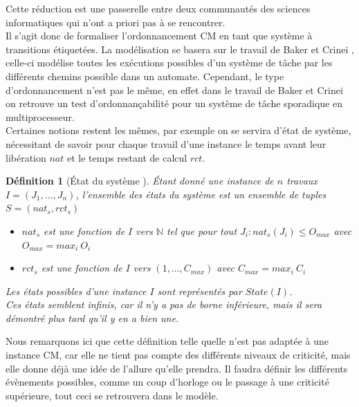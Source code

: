 \documentclass[a4paper]{report}
\theoremstyle{break}
\newtheorem{defin}{Définition}
\begin{document}
Cette réduction est une passerelle entre deux communautés des sciences informatiques qui n'ont a priori pas à se rencontrer.\\

Il s'agit donc de formaliser l'ordonnancement CM en tant que système à transitions étiquetées. La modélisation se basera sur le travail de Baker et Crinei \cite{bakerbrute}, celle-ci modélise toutes les exécutions possibles d'un système de tâche par les différents chemins possible dans un automate. Cependant, le type d'ordonnancement n'est pas le même, en effet dans le travail de Baker et Crinei on retrouve un test d'ordonnançabilité pour un système de tâche sporadique en multiprocesseur.\\

Certaines notions restent les mêmes, par exemple on se servira d'état de système, nécessitant de savoir pour chaque travail d'une instance le temps avant leur libération $nat$ et le temps restant de calcul $rct$.

\begin{defin}[État du système \cite{geeraerts2013multiprocessor}]
Étant donné une instance de $n$ travaux $I = (J_1, ..., J_n)$, l'ensemble des états du système est un ensemble de tuples $S = (nat_s, rct_s)$
\begin{itemize}
\item $nat_s$ est une fonction de $I$ vers $\mathbb{N}$ tel que pour tout $J_i : nat_s(J_i) \leq O_{max}$ avec $O_{max} = max_i\ O_i$
\item $rct_s$ est une fonction de $I$ vers $(1,...,C_{max})$ avec $C_{max} = max_i\ C_i$
\end{itemize}

Les états possibles d'une instance $I$ sont représentés par $State(I)$.\\
Ces états semblent infinis, car il n'y a pas de borne inférieure, mais il sera démontré plus tard qu'il y en a bien une.
\end{defin}

Nous remarquons ici que cette définition telle quelle n'est pas adaptée à une instance CM, car elle ne tient pas compte des différents niveaux de criticité, mais elle donne déjà une idée de l'allure qu'elle prendra. Il faudra définir les différents évènements possibles, comme un coup d'horloge ou le passage à une criticité supérieure, tout ceci se retrouvera dans le modèle.
\end{document}
